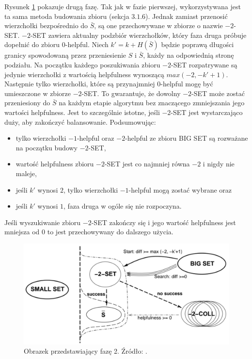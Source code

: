 Rysunek \ref{im:phase_2} pokazuje drugą fazę.
Tak jak w fazie pierwszej, wykorzystywana jest ta sama metoda budowania zbioru (sekcja $3.1.6$).
Jednak zamiast przenosić wierzchołki bezpośrednio do $\bar{S}$, są one przechowywane w zbiorze o nazwie $-2$-SET.
$-2$-SET zawiera aktualny podzbiór wierzchołków, który faza druga próbuje dopełnić do zbioru $0$-helpful.
Niech $k' = k + H(\bar{S})$ będzie poprawą długości granicy spowodowaną przez przeniesienie $S$ i $\bar{S}$, każdy
na odpowiednią stronę podziału.
Na początku każdego poszukiwania zbioru $-2$-SET rozpatrywane są jedynie wierzchołki z wartością helpfulness wynoszącą
$max(-2, -k'+1)$.
Następnie tylko wierzchołki, które są przynajmniej $0$-helpful mogę być umieszczone w zbiorze $-2$-SET.
To gwarantuje, że dowolny $-2$-SET może zostać przeniesiony do $\bar{S}$ na każdym etapie algorytmu bez znaczącego
zmniejszania jego wartości helpfulness.
Jest to szczególnie istotne, jeśli $-2$-SET jest wystarczająco duży, aby zakończyć balansowanie.
Podsumowując:
\begin{itemize}
    \item {tylko wierzchołki $-1$-helpful oraz $-2$-helpful ze zbioru BIG SET są rozważane na początku budowy $-2$-SET,}
    \item wartość helpfulness zbioru $-2$-SET jest co najmniej równa $-2$ i nigdy nie maleje,
    \item jeśli $k'$ wynosi $2$, tylko wierzchołki $-1$-helpful mogą zostać wybrane oraz
    \item jeśli $k'$ wynosi $1$, faza druga w ogóle się nie rozpoczyna.
\end{itemize}

Jeśli wyszukiwanie zbioru $-2$-SET zakończy się i jego wartość helpfulness jest mniejsza od $0$ to jest przechowywany
do dalszego użycia.
\begin{figure}[h]
    \centering
    \includegraphics[width=0.65\linewidth]{images/phase2}
    \caption{Obrazek przedstawiający fazę 2. Źródło: \cite{article}.}
    \label{im:phase_2}
\end{figure}
\newpage

